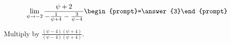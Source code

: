 \documentclass{ximera}
\author{Bart Snapp}
\begin{document}
\begin{exercise}

\[
\lim_{\psi\to -2 } \frac{\psi +2}{-\frac{1}{\psi +4}-\frac{3}{\psi -4}}  \begin{prompt}=\answer{3}\end{prompt}
\]
\begin{hint}
Multiply by $\frac{(\psi -4) (\psi +4)}{(\psi -4) (\psi +4)}$.
\end{hint}
\end{exercise}
\end{document}
